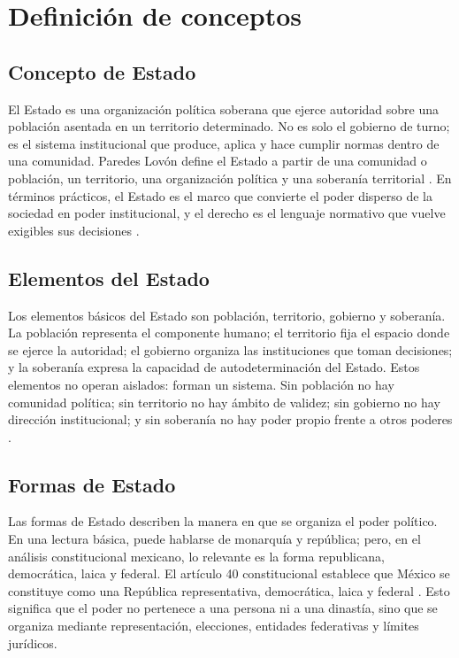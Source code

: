 \documentclass[
spanish,
letterpaper, oneside
]{article}
\begin{document}
	\section{Definición de conceptos}
	
	\subsection{Concepto de Estado}
	
	El Estado es una organización política soberana que ejerce autoridad sobre una población asentada en un territorio determinado. No es solo el gobierno de turno; es el sistema institucional que produce, aplica y hace cumplir normas dentro de una comunidad. Paredes Lovón define el Estado a partir de una comunidad o población, un territorio, una organización política y una soberanía territorial \citep{paredes2020}. En términos prácticos, el Estado es el marco que convierte el poder disperso de la sociedad en poder institucional, y el derecho es el lenguaje normativo que vuelve exigibles sus decisiones \citep{garcia2002}.
	
	\subsection{Elementos del Estado}
	
	Los elementos básicos del Estado son población, territorio, gobierno y soberanía. La población representa el componente humano; el territorio fija el espacio donde se ejerce la autoridad; el gobierno organiza las instituciones que toman decisiones; y la soberanía expresa la capacidad de autodeterminación del Estado. Estos elementos no operan aislados: forman un sistema. Sin población no hay comunidad política; sin territorio no hay ámbito de validez; sin gobierno no hay dirección institucional; y sin soberanía no hay poder propio frente a otros poderes \citep{paredes2020}.
	
	\subsection{Formas de Estado}
	
	Las formas de Estado describen la manera en que se organiza el poder político. En una lectura básica, puede hablarse de monarquía y república; pero, en el análisis constitucional mexicano, lo relevante es la forma republicana, democrática, laica y federal. El artículo 40 constitucional establece que México se constituye como una República representativa, democrática, laica y federal \citep{cpeum2026}. Esto significa que el poder no pertenece a una persona ni a una dinastía, sino que se organiza mediante representación, elecciones, entidades federativas y límites jurídicos.
	
\end{document}
